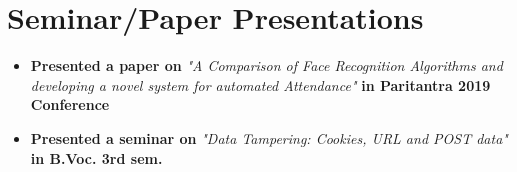 \documentclass[letterpaper]{twentysecondcv} %
\begin{document}
\section{Seminar/Paper Presentations}
\begin{itemize}
\item{
\textbf{Presented a paper on} \emph{"A Comparison of Face Recognition Algorithms and developing a
novel system for automated Attendance"} \textbf{in Paritantra 2019 Conference}}
\item
{\textbf{Presented a seminar on} \emph{"Data Tampering: Cookies, URL and POST data"} \textbf{in B.Voc. 3rd sem.}}
\end{itemize}
\end{document}
